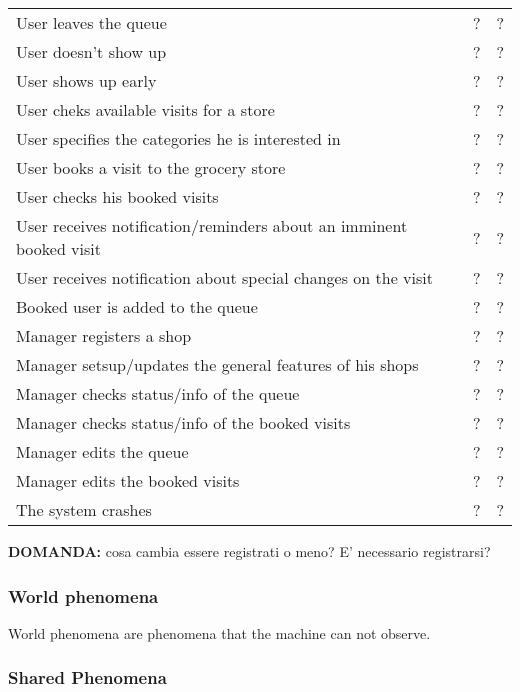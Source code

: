 \begin{tabular}{|l|c|c|}
    User leaves the queue & ? & ? \\
    User doesn't show up & ? & ? \\
    User shows up early & ? & ? \\
    \hline
    User cheks available visits for a store & ? & ? \\
    User specifies the categories he is interested in & ? & ? \\
    User books a visit to the grocery store & ? & ? \\
    User checks his booked visits & ? & ? \\
    User receives notification/reminders about an imminent booked visit & ? & ? \\
    User receives notification about special changes on the visit & ? & ? \\
    Booked user is added to the queue & ? & ? \\ %
    \hline
    Manager registers a shop & ? & ? \\
    Manager setsup/updates the general features of his shops & ? & ? \\
    Manager checks status/info of the queue & ? & ? \\
    Manager checks status/info of the booked visits & ? & ? \\
    Manager edits the queue & ? & ? \\
    Manager edits the booked visits & ? & ? \\
    \hline
    The system crashes & ? & ? \\
    \hline
\end{tabular}

\textbf{DOMANDA:} cosa cambia essere registrati o meno? E' necessario registrarsi?

\subsubsection{World phenomena}
\label{subsubsect:worldphenomena}

World phenomena are phenomena that the machine can not observe.

\subsubsection{Shared Phenomena}
\label{subsubsect:sharedphenomena}

